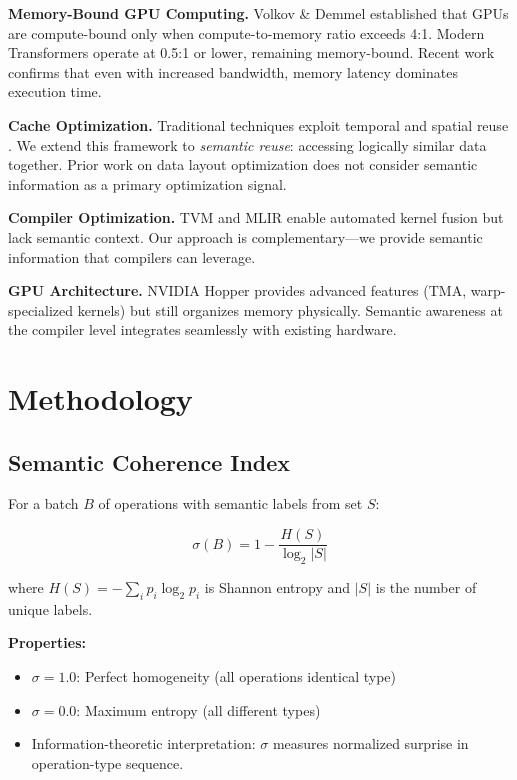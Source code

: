 \documentclass[11pt,twocolumn]{article}
\begin{document}
\textbf{Memory-Bound GPU Computing.} Volkov \& Demmel \cite{volkov08} established that GPUs are compute-bound only when compute-to-memory ratio exceeds 4:1. Modern Transformers operate at 0.5:1 or lower, remaining memory-bound. Recent work \cite{kim21,chen18} confirms that even with increased bandwidth, memory latency dominates execution time.

\textbf{Cache Optimization.} Traditional techniques exploit temporal and spatial reuse \cite{lam91,goto08}. We extend this framework to \textit{semantic reuse}: accessing logically similar data together. Prior work on data layout optimization \cite{jia16} does not consider semantic information as a primary optimization signal.

\textbf{Compiler Optimization.} TVM \cite{chen18} and MLIR \cite{lattner21} enable automated kernel fusion but lack semantic context. Our approach is complementary---we provide semantic information that compilers can leverage.

\textbf{GPU Architecture.} NVIDIA Hopper \cite{hopper22} provides advanced features (TMA, warp-specialized kernels) but still organizes memory physically. Semantic awareness at the compiler level integrates seamlessly with existing hardware.

\section{Methodology}

\subsection{Semantic Coherence Index}

For a batch $B$ of operations with semantic labels from set $S$:

\begin{equation}
\sigma(B) = 1 - \frac{H(S)}{\log_2 |S|}
\end{equation}

\noindent
where $H(S) = -\sum_{i} p_i \log_2 p_i$ is Shannon entropy and $|S|$ is the number of unique labels.

\textbf{Properties:}
\begin{itemize}
\item $\sigma = 1.0$: Perfect homogeneity (all operations identical type)
\item $\sigma = 0.0$: Maximum entropy (all different types)
\item Information-theoretic interpretation: $\sigma$ measures normalized surprise in operation-type sequence.
\end{itemize}
\end{document}
